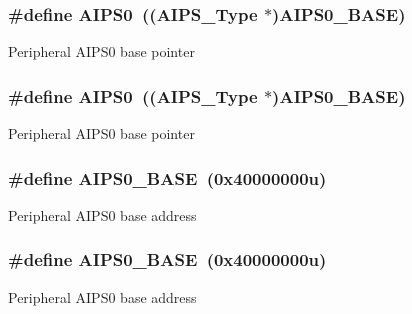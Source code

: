 \subsubsection[{\texorpdfstring{A\+I\+P\+S0}{AIPS0}}]{\setlength{\rightskip}{0pt plus 5cm}\#define A\+I\+P\+S0~(({\bf A\+I\+P\+S\+\_\+\+Type} $\ast$){\bf A\+I\+P\+S0\+\_\+\+B\+A\+SE})}\hypertarget{group__AIPS__Peripheral__Access__Layer_gadd0f01794c41f63593cc12e3e6005a95}{}\label{group__AIPS__Peripheral__Access__Layer_gadd0f01794c41f63593cc12e3e6005a95}
Peripheral A\+I\+P\+S0 base pointer 
\subsubsection[{\texorpdfstring{A\+I\+P\+S0}{AIPS0}}]{\setlength{\rightskip}{0pt plus 5cm}\#define A\+I\+P\+S0~(({\bf A\+I\+P\+S\+\_\+\+Type} $\ast$){\bf A\+I\+P\+S0\+\_\+\+B\+A\+SE})}\hypertarget{group__AIPS__Peripheral__Access__Layer_gadd0f01794c41f63593cc12e3e6005a95}{}\label{group__AIPS__Peripheral__Access__Layer_gadd0f01794c41f63593cc12e3e6005a95}
Peripheral A\+I\+P\+S0 base pointer 
\subsubsection[{\texorpdfstring{A\+I\+P\+S0\+\_\+\+B\+A\+SE}{AIPS0_BASE}}]{\setlength{\rightskip}{0pt plus 5cm}\#define A\+I\+P\+S0\+\_\+\+B\+A\+SE~(0x40000000u)}\hypertarget{group__AIPS__Peripheral__Access__Layer_ga0162f7b0dfde801ad0aec6b77bf9d568}{}\label{group__AIPS__Peripheral__Access__Layer_ga0162f7b0dfde801ad0aec6b77bf9d568}
Peripheral A\+I\+P\+S0 base address 
\subsubsection[{\texorpdfstring{A\+I\+P\+S0\+\_\+\+B\+A\+SE}{AIPS0_BASE}}]{\setlength{\rightskip}{0pt plus 5cm}\#define A\+I\+P\+S0\+\_\+\+B\+A\+SE~(0x40000000u)}\hypertarget{group__AIPS__Peripheral__Access__Layer_ga0162f7b0dfde801ad0aec6b77bf9d568}{}\label{group__AIPS__Peripheral__Access__Layer_ga0162f7b0dfde801ad0aec6b77bf9d568}
Peripheral A\+I\+P\+S0 base address 
